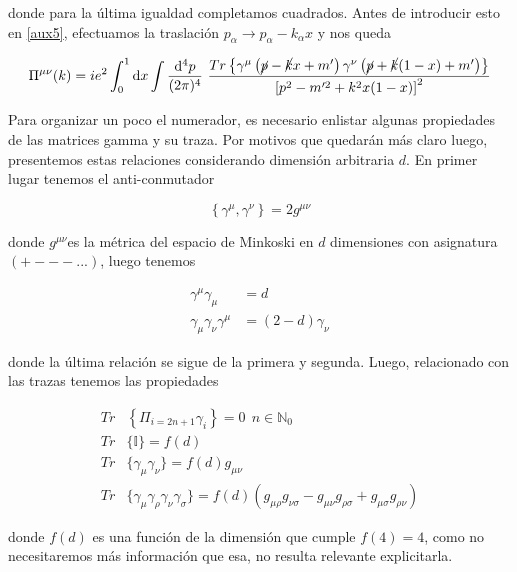 \documentclass{article}
\numberwithin{equation}{section}
\begin{document}
donde para la última igualdad completamos cuadrados. Antes de introducir esto en \ref{aux5}, efectuamos la traslación $ p_{\alpha} \longrightarrow p_{\alpha} - k_{\alpha}x $ y nos queda

\begin{equation}\label{aux6}
\Pi^{\mu\nu}(k) = i e^2 \int_0^1 \mathrm{d}x \int \frac{\mathrm{d^4}p}{(2\pi)^4} \ \frac{Tr\left\{ \gamma^{\mu}\left(\cancel{p}-\cancel{k}x +m'\right)\gamma^{\nu}\left(\cancel{p}+\cancel{k}(1-x)+m'\right) \right\}}{\left[p^2 -m'^2 + k^2x(1-x)\right]^2}   
\end{equation}

Para organizar un poco el numerador, es necesario enlistar algunas propiedades de las matrices gamma y su traza. Por motivos que quedarán más claro luego, presentemos estas relaciones considerando dimensión arbitraria $ d $. En primer lugar tenemos el anti-conmutador

\begin{equation}\label{gamma1}
\left\{\gamma^{\mu},\gamma^{\nu}\right\}=2g^{\mu\nu}
\end{equation} 

donde $ g^{\mu\nu} $es la métrica del espacio de Minkoski en $ d $ dimensiones con asignatura $ (+---...) $, luego tenemos

\begin{equation}\label{gamma2}
\begin{aligned}
\gamma^{\mu}\gamma_{\mu}&=d\\
\gamma_{\mu}\gamma_{\nu}\gamma^{\mu}&=(2-d)\gamma_{\nu}
\end{aligned}
\end{equation} 

donde la última relación se sigue de la primera y segunda. Luego, relacionado con las trazas tenemos las propiedades

\begin{equation}\label{gamma3}
\begin{aligned}
Tr&\left\{\Pi_{i=2n+1}\gamma_i\right\}=0 \ \ n\in \mathbb{N}_0\\
Tr&\{\mathbb{I}\}=f(d)\\
Tr&\{\gamma_{\mu}\gamma_{\nu}\}=f(d)g_{\mu\nu}\\
Tr&\{\gamma_{\mu}\gamma_{\rho}\gamma_{\nu}\gamma_{\sigma}\}=f(d)\left(g_{\mu\rho}g_{\nu\sigma}-g_{\mu\nu}g_{\rho\sigma}+g_{\mu\sigma}g_{\rho\nu}\right)
\end{aligned}
\end{equation}

donde $ f(d) $ es una función de la dimensión que cumple $ f(4)=4 $, como no necesitaremos más información que esa, no resulta relevante explicitarla.\\
\end{document}
